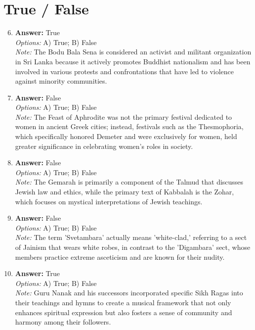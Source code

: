 \documentclass[12pt]{article}
\begin{document}
\section*{True / False}
\begin{enumerate}[label=\arabic*.]
\setcounter{enumi}{5}
\item \textbf{Answer:} True
\\ \textit{Options:} A) True; B) False
\\ \textit{Note:} The Bodu Bala Sena is considered an activist and militant organization in Sri Lanka because it actively promotes Buddhist nationalism and has been involved in various protests and confrontations that have led to violence against minority communities.
\item \textbf{Answer:} False
\\ \textit{Options:} A) True; B) False
\\ \textit{Note:} The Feast of Aphrodite was not the primary festival dedicated to women in ancient Greek cities; instead, festivals such as the Thesmophoria, which specifically honored Demeter and were exclusively for women, held greater significance in celebrating women's roles in society.
\item \textbf{Answer:} False
\\ \textit{Options:} A) True; B) False
\\ \textit{Note:} The Gemarah is primarily a component of the Talmud that discusses Jewish law and ethics, while the primary text of Kabbalah is the Zohar, which focuses on mystical interpretations of Jewish teachings.
\item \textbf{Answer:} False
\\ \textit{Options:} A) True; B) False
\\ \textit{Note:} The term 'Svetambara' actually means 'white-clad,' referring to a sect of Jainism that wears white robes, in contrast to the 'Digambara' sect, whose members practice extreme asceticism and are known for their nudity.
\item \textbf{Answer:} True
\\ \textit{Options:} A) True; B) False
\\ \textit{Note:} Guru Nanak and his successors incorporated specific Sikh Ragas into their teachings and hymns to create a musical framework that not only enhances spiritual expression but also fosters a sense of community and harmony among their followers.
\end{enumerate}
\end{document}
